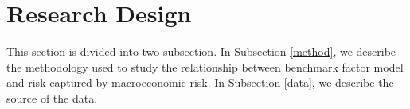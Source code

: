 \documentclass[11pt,halfline,a4paper]{ouparticle}
\begin{document}











\section{Research Design}
\label{RD}

This section is divided into two subsection. In Subsection \ref{method}, we describe the methodology used to study the relationship between benchmark factor model and risk captured by macroeconomic risk. In Subsection \ref{data}, we describe the source of the data. 
\end{document}
